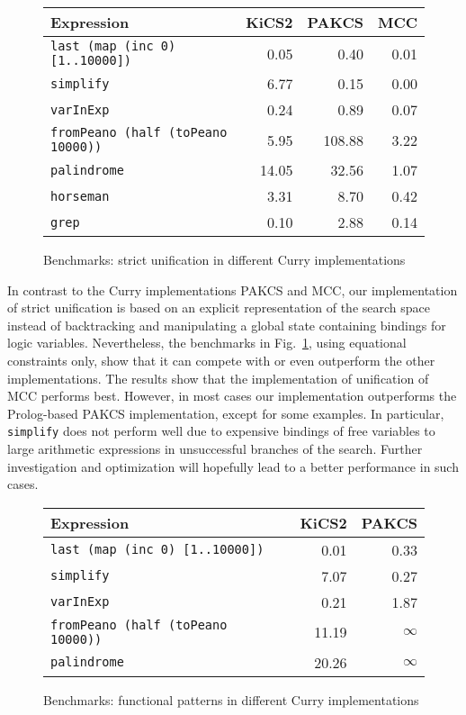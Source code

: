 \documentclass{llncs}
\newcommand{\code}[1]{\mbox{\small\texttt{#1}}}
\begin{document}
\begin{figure}[t]
\centering
\begin{tabular}{|l|r|r|r|}
\hline
Expression                              & KiCS2 & PAKCS  & MCC  \\
\hline
\code{last (map (inc 0) [1..10000])}   & 0.05  & 0.40   &  0.01\\
\code{simplify}                         & 6.77  & 0.15   & 0.00 \\
\code{varInExp}                         & 0.24  & 0.89   & 0.07 \\
\code{fromPeano (half (toPeano 10000))} & 5.95  & 108.88 & 3.22 \\
\code{palindrome}                       & 14.05 & 32.56  & 1.07 \\
\code{horseman}                         & 3.31  & 8.70   & 0.42 \\
\code{grep}                             & 0.10  & 2.88   & 0.14 \\
\hline
\end{tabular}
\caption{Benchmarks: strict unification in different Curry implementations}
 \label{fig:unification}
\end{figure}

In contrast to the Curry implementations PAKCS and MCC,
our implementation of strict unification is based
on an explicit representation of the search space instead of
backtracking and manipulating
a global state containing bindings for logic variables.
Nevertheless, the benchmarks in Fig.~\ref{fig:unification},
using equational constraints only,
show that it can compete with or even outperform the other implementations.
The results show that the implementation of unification
of MCC performs best. However, in most cases our implementation 
outperforms the Prolog-based PAKCS implementation, 
except for some examples. In particular, \code{simplify} does not perform well
due to expensive bindings of free variables to large arithmetic expressions
in unsuccessful branches of the search. Further investigation
and optimization will hopefully lead to a better performance in
such cases.

\begin{figure}[t]
\centering
\begin{tabular}{|l|r|r|}
\hline
Expression                              & KiCS2 & PAKCS    \\
\hline
\code{last (map (inc 0) [1..10000])}   &  0.01 & 0.33     \\
\code{simplify}                         & 7.07  & 0.27     \\
\code{varInExp}                         &  0.21  &  1.87    \\
\code{fromPeano (half (toPeano 10000))} & 11.19 & $\infty$ \\
\code{palindrome}                       & 20.26 & $\infty$ \\
\hline
\end{tabular}
\caption{Benchmarks: functional patterns in different Curry implementations}
 \label{fig:functional-patterns}
\end{figure}
\end{document}
